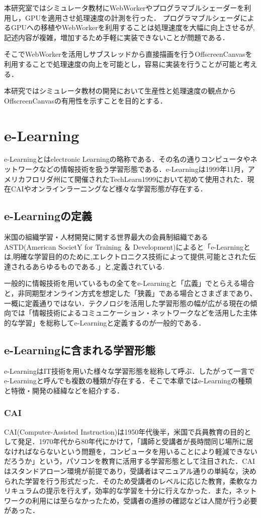 \documentclass[a4j,12pt]{jsarticle}
\begin{document}
本研究室ではシミュレータ教材にWebWorkerやプログラマブルシェーダーを利用し，GPUを適用させ処理速度の計測を行った．
プログラマブルシェーダによるGPUへの移植やWebWorkerを利用することは処理速度を大幅に向上させるが,記述内容が複雑，増加するため手軽に実装できないことが問題である．

そこでWebWorkerを活用しサブスレッドから直接描画を行うOffscreenCanvasを利用することで処理速度の向上を可能とし，容易に実装を行うことが可能と考える．

本研究ではシミュレータ教材の開発において生産性と処理速度の観点からOffscreenCanvasの有用性を示すことを目的とする．

\newpage
\section{e-Learning}
e-Learningとはelectronic Learningの略称である．その名の通りコンピュータやネットワークなどの情報技術を扱う学習形態である．e-Learningは1999年11月，アメリカフロリダ州にて開催されたTechLearn1999において初めて使用された．現在CAIやオンラインラーニングなど様々な学習形態が存在する． 

\subsection{e-Learningの定義}
米国の組織学習・人材開発に関する世界最大の会員制組織であるASTD(American SocietY for Training ＆ Development)によると「e-Learningとは,明確な学習目的のために,エレクトロニクス技術によって提供,可能とされた伝達されるあらゆるものである.」と,定義されている.

一般的に情報技術を用いているもの全てをe-Learningと「広義」でとらえる場合と，非同期型オンライン方式を想定した「狭義」である場合とさまざまであり、一概に定義通りではない．テクノロジを活用した学習形態の幅が広がる現在の傾向では「情報技術によるコミュニケーション・ネットワークなどを活用した主体的な学習」を総称してe-Learningと定義するのが一般的である．

\subsection{e-Learningに含まれる学習形態}
e-LearningはIT技術を用いた様々な学習形態を総称して呼ぶ．したがって一言でe-Learningと呼んでも複数の種類が存在する．そこで本章ではe-Learningの種類と特徴・開発の経緯などを紹介する．

\subsubsection{CAI}
CAI(Computer-Assisted Instruction)は1950年代後半，米国で兵員教育の目的として発足．1970年代から80年代にかけて，「講師と受講者が長時間同じ場所に居なければならないという問題を，コンピュータを用いることにより軽減できないだろうか」という，パソコンを教育に活用する学習形態として注目された．CAIはスタンドアローン環境が前提であり，受講者はマニュアル通りの単純な，決められた学習を行う形式だった．そのため受講者のレベルに応じた教育，柔軟なカリキュラムの提示を行えず，効率的な学習を十分に行えなかった．また，ネットワークの利用には至らなかったため，受講者の進捗の確認などは人間が行う必要があった．
\end{document}
